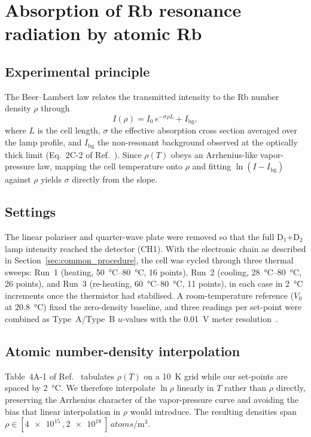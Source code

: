 \section{Absorption of Rb resonance radiation by atomic Rb}

\subsection{Experimental principle}
The Beer--Lambert law relates the transmitted intensity to the Rb number
density $\rho$ through
\begin{equation}
  I(\rho) = I_0\,e^{-\sigma\rho L} + I_{\mathrm{bg}},
  \label{eq:beer_lambert}
\end{equation}
where $L$ is the cell length, $\sigma$ the effective absorption cross
section averaged over the lamp profile, and $I_{\mathrm{bg}}$ the
non-resonant background observed at the optically thick limit
(Eq.~2C-2 of Ref.~\cite{OpticalPumpingRubidium2002}). Since $\rho(T)$
obeys an Arrhenius-like vapor-pressure law, mapping the cell temperature
onto $\rho$ and fitting $\ln(I-I_{\mathrm{bg}})$ against $\rho$ yields
$\sigma$ directly from the slope.

\subsection{Settings}
The linear polariser and quarter-wave plate were removed so that the full
D$_1$+D$_2$ lamp intensity reached the detector (CH1). With the electronic
chain as described in Section~\ref{sec:common_procedure}, the cell was
cycled through three thermal sweeps: Run~1 (heating, \SIrange{50}{80}{\celsius},
16 points), Run~2 (cooling, \SIrange{28}{80}{\celsius}, 26 points), and
Run~3 (re-heating, \SIrange{60}{80}{\celsius}, 11 points), in each case in
\SI{2}{\celsius} increments once the thermistor had stabilised. A room-temperature
reference ($V_0$ at \SI{20.8}{\celsius}) fixed the zero-density baseline, and
three readings per set-point were combined as Type~A/Type~B $u$-values with
the \SI{0.01}{\volt} meter resolution~\cite{OpticalPumpingRubidium2002}.

\subsection{Atomic number-density interpolation}
Table~4A-1 of Ref.~\cite{OpticalPumpingRubidium2002} tabulates $\rho(T)$ on a
\SI{10}{\kelvin} grid while our set-points are spaced by \SI{2}{\celsius}. We
therefore interpolate $\ln\rho$ linearly in $T$ rather than $\rho$ directly,
preserving the Arrhenius character of the vapor-pressure curve and avoiding
the bias that linear interpolation in $\rho$ would introduce. The resulting
densities span $\rho \in [\SI{4e15}{}, \SI{2e18}{}]\,\si{atoms\per\meter\cubed}$.

